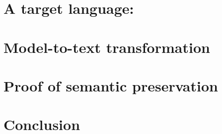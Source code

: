 \documentclass[pdflatex,sn-mathphys]{sn-jnl}%
\theoremstyle{thmstyleone}%
\theoremstyle{thmstyletwo}%
\theoremstyle{thmstylethree}%
\begin{document}

\section{A target language: \hvhdl{}}
\label{sec:hvhdl}

\section{Model-to-text transformation}
\label{sec:m2t}

\section{Proof of semantic preservation}
\label{sec:proof}

\section{Conclusion}
\label{sec:concl}



\end{document}
